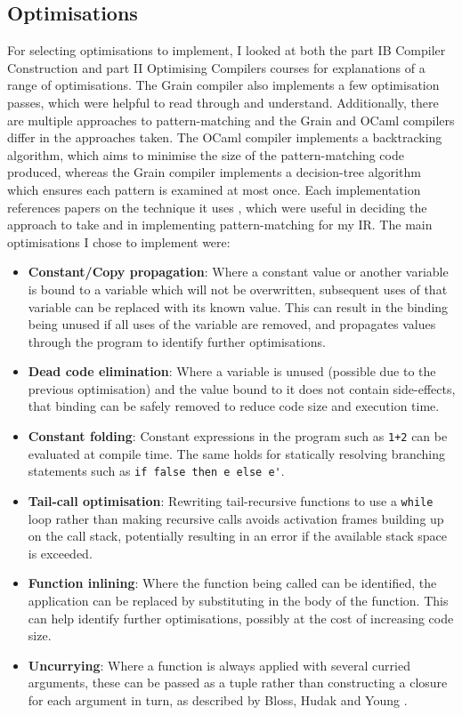 \subsection{Optimisations}
For selecting optimisations to implement, I looked at both the part IB Compiler Construction \cite{IB-compilers} and part II Optimising Compilers \cite{optimising-compilers} courses for explanations of a range of optimisations. The Grain compiler also implements a few optimisation passes, which were helpful to read through and understand. Additionally, there are multiple approaches to pattern-matching and the Grain and OCaml compilers differ in the approaches taken. The OCaml compiler implements a backtracking algorithm, which aims to minimise the size of the pattern-matching code produced, whereas the Grain compiler implements a decision-tree algorithm which ensures each pattern is examined at most once. Each implementation references papers on the technique it uses \cite{ocamlpatternmatch, decisiontrees}, which were useful in deciding the approach to take and in implementing pattern-matching for my IR.
The main optimisations I chose to implement were:
\begin{itemize}
\item \textbf{Constant/Copy propagation}: Where a constant value or another variable is bound to a variable which will not be overwritten, subsequent uses of that variable can be replaced with its known value. This can result in the binding being unused if all uses of the variable are removed, and propagates values through the program to identify further optimisations.

\item \textbf{Dead code elimination}: Where a variable is unused (possible due to the previous optimisation) and the value bound to it does not contain side-effects, that binding can be safely removed to reduce code size and execution time.

\item \textbf{Constant folding}: Constant expressions in the program such as \verb|1+2| can be evaluated at compile time. The same holds for statically resolving branching statements such as \verb|if false then e else e'|.

\item \textbf{Tail-call optimisation}: Rewriting tail-recursive functions to use a \verb|while| loop rather than making recursive calls avoids activation frames building up on the call stack, potentially resulting in an error if the available stack space is exceeded.

\item \textbf{Function inlining}: Where the function being called can be identified, the application can be replaced by substituting in the body of the function. This can help identify further optimisations, possibly at the cost of increasing code size.

\item \textbf{Uncurrying}: Where a function is always applied with several curried arguments, these can be passed as a tuple rather than constructing a closure for each argument in turn, as described by Bloss, Hudak and Young \cite{uncurry}. 

\end{itemize}

